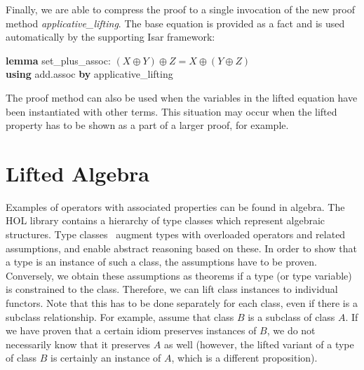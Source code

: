 Finally, we are able to compress the proof to a single invocation of the new
proof method \emph{applicative\_lifting}.
The base equation is provided as a fact and is used automatically by the
supporting Isar framework:
\begin{isabelle}
\textbf{lemma} set\_plus\_assoc: $(X \oplus Y) \oplus Z = X \oplus (Y \oplus Z)$ \\
\textbf{using} add.assoc \textbf{by} applicative\_lifting
\end{isabelle}
The proof method can also be used when the variables in the lifted equation
have been instantiated with other terms.
This situation may occur when the lifted property has to be shown as a part of
a larger proof, for example.


\section{Lifted Algebra}\label{subsec:lifted-algebra}

Examples of operators with associated properties can be found in algebra.
The HOL library contains a hierarchy of type classes which represent algebraic
structures.
Type classes~\cite{haftmann07} augment types with overloaded operators and
related assumptions, and enable abstract reasoning based on these.
In order to show that a type is an instance of such a class, the assumptions
have to be proven.
Conversely, we obtain these assumptions as theorems if a type (or type variable)
is constrained to the class.
Therefore, we can lift class instances to individual functors.
Note that this has to be done separately for each class, even if there is a
subclass relationship.
For example, assume that class $B$ is a subclass of class $A$.
If we have proven that a certain idiom preserves instances of $B$,
we do not necessarily know that it preserves $A$ as well
(however, the lifted variant of a type of class $B$ is certainly an instance of
$A$, which is a different proposition).

